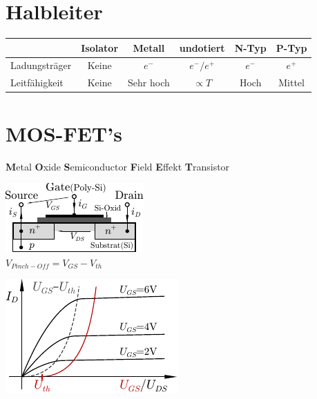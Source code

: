 \documentclass[6pt,a4paper]{scrartcl}
\begin{document}
\begin{multicols*}{3}
\section{Halbleiter}
\begin{tabular}{l|c|c|c|c|c}
	& Isolator & Metall & undotiert & N-Typ & P-Typ \\ \hline
	Ladungsträger & Keine & $e^-$ & $e^- / e^+$ & $e^-$ & $e^+$ \\
	Leitfähigkeit & Keine & Sehr hoch & $\propto T$ & Hoch & Mittel\\
\end{tabular}

\section{MOS-FET's}
\textbf{M}etal \textbf{O}xide \textbf{S}emiconductor \textbf{F}ield \textbf{E}ffekt \textbf{T}ransistor\\
\parbox{4.0cm}{ \includegraphics{./img/ds/mosfet.pdf} \\ $V_{Pinch-Off} = V_{GS} - V_{th}$ } \parbox{3.0cm}{ \includegraphics{./img/ds/char_nmos.pdf} }



\end{multicols*}
\end{document}
